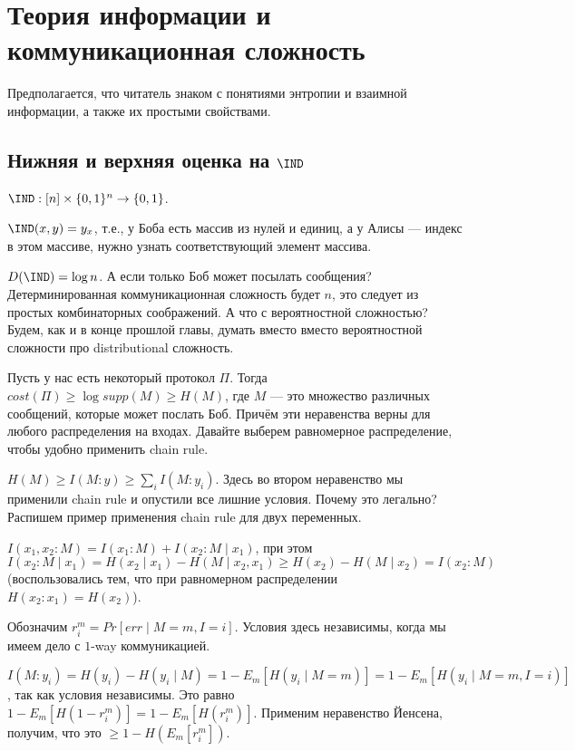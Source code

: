 \chapter{Теория информации и коммуникационная сложность}

Предполагается, что читатель знаком с понятиями энтропии и взаимной информации, а также их простыми свойствами.

\section{Нижняя и верхняя оценка на $\IND$}

$\IND : [n] \times \{0, 1\}^n \rightarrow \{0, 1\}$. 

$\IND(x, y) = y_x$, т.е., у Боба есть массив из нулей и единиц, а у Алисы --- индекс в этом массиве, нужно узнать соответствующий элемент массива.

$D(\IND) = \log{n}$. А если только Боб может посылать сообщения? Детерминированная коммуникационная сложность будет $n$, это следует из простых комбинаторных соображений. А что с вероятностной сложностью? Будем, как и в конце прошлой главы, думать вместо вместо вероятностной сложности про distributional сложность.

Пусть у нас есть некоторый протокол $\Pi$. Тогда $cost(\Pi) \geq \log{supp(M)} \geq H(M)$, где $M$ --- это множество различных сообщений, которые может послать Боб. Причём эти неравенства верны для любого распределения на входах. Давайте выберем равномерное распределение, чтобы удобно применить chain rule.

$H(M) \geq I(M : y) \geq \sum_i I(M : y_i)$. Здесь во втором неравенство мы применили chain rule и опустили все лишние условия. Почему это легально? Распишем пример применения chain rule для двух переменных.

$I(x_1, x_2 : M) = I(x_1 : M) + I(x_2 : M \mid x_1)$, при этом $I(x_2 : M \mid x_1) = H(x_2 \mid x_1) - H(M \mid x_2, x_1) \geq H(x_2) - H(M \mid x_2) = I(x_2 : M)$ (воспользовались тем, что при равномерном распределении $H(x_2 : x_1) = H(x_2)$).

Обозначим $r_i^m = Pr[err \mid M = m, I = i]$. Условия здесь независимы, когда мы имеем дело с $1$-way коммуникацией.

$I(M : y_i) = H(y_i) - H(y_i \mid M) = 1 - E_m[H(y_i \mid M = m)] = 1 - E_m[H(y_i \mid M = m, I = i)]$, так как условия независимы. Это равно $1 - E_m[H(1 - r_i^m)] = 1 - E_m[H(r_i^m)]$. Применим неравенство Йенсена, получим, что это $\geq 1 - H(E_m[r_i^m])$.

